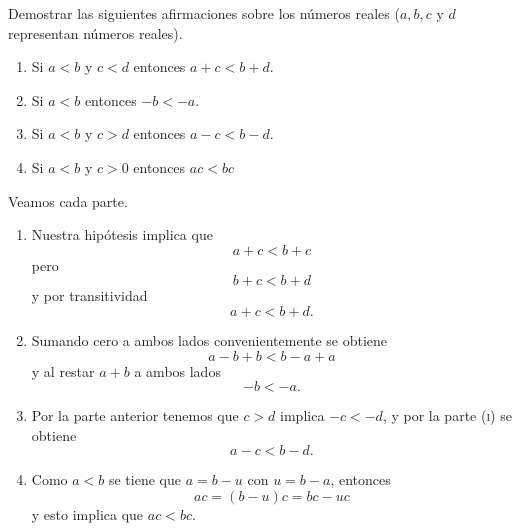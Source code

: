 \begin{ejer}
	Demostrar las siguientes afirmaciones sobre los números reales
	($ a,b,c $ y $ d $ representan números reales).
	\begin{enumerate}
		\item Si $ a<b $ y $ c<d $ entonces $ a+c<b+d $.
		\item Si $ a<b $ entonces $ -b<-a $.
		\item Si $ a<b $ y $ c>d $ entonces $ a-c<b-d $.
		\item Si $ a<b $ y $ c>0 $ entonces $ ac<bc $
	\end{enumerate}
	\begin{sol}
		Veamos cada parte.
		\begin{enumerate}
			\item Nuestra hipótesis implica que
				\[
					a+c<b+c
				\]
				pero 
				\[
					b+c<b+d
				\]
				y por transitividad
				\[
					a+c<b+d.
				\]
			\item Sumando cero a ambos lados convenientemente
				se obtiene
				\[
					a-b+b<b-a+a
				\]
				y al restar $ a+b $ a ambos lados
				\[
					-b<-a.
				\]
			\item Por la parte anterior tenemos que $ c>d $ implica
				$ -c<-d $, y por la parte \textsc{(i)} se obtiene 
				\[
					a-c<b-d.
				\]
			\item Como $ a<b $ se tiene que $ a=b-u $ con $ u=b-a $,
				entonces
				\[
					ac = (b-u)c = bc-uc
				\]
				y esto implica que $ ac<bc $.
		\end{enumerate}
	\end{sol}
\end{ejer}

